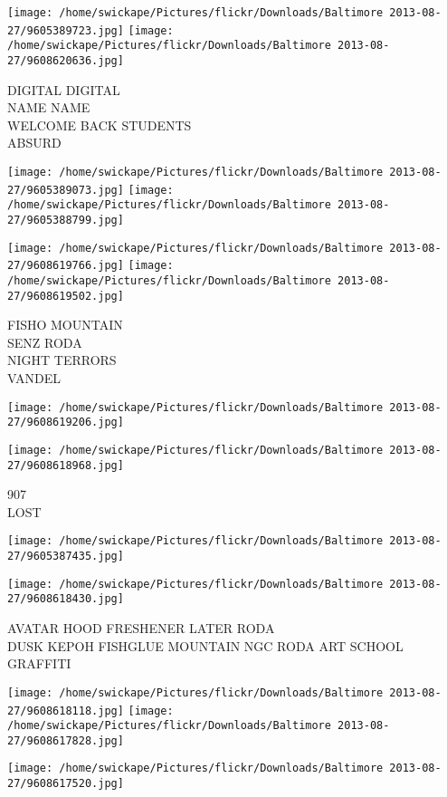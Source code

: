 \documentclass[10pt,letterpaper]{article}
\begin{document}
\texttt{[image: /home/swickape/Pictures/flickr/Downloads/Baltimore 2013-08-27/9605389723.jpg]}
\texttt{[image: /home/swickape/Pictures/flickr/Downloads/Baltimore 2013-08-27/9608620636.jpg]}

DIGITAL DIGITAL\\
NAME NAME\\
WELCOME BACK STUDENTS\\
ABSURD
\pagebreak

\texttt{[image: /home/swickape/Pictures/flickr/Downloads/Baltimore 2013-08-27/9605389073.jpg]}
\texttt{[image: /home/swickape/Pictures/flickr/Downloads/Baltimore 2013-08-27/9605388799.jpg]}

\texttt{[image: /home/swickape/Pictures/flickr/Downloads/Baltimore 2013-08-27/9608619766.jpg]}
\texttt{[image: /home/swickape/Pictures/flickr/Downloads/Baltimore 2013-08-27/9608619502.jpg]}

FISHO MOUNTAIN\\
SENZ RODA\\
NIGHT TERRORS\\
VANDEL
\pagebreak

\texttt{[image: /home/swickape/Pictures/flickr/Downloads/Baltimore 2013-08-27/9608619206.jpg]}

\vspace{0.25in}
\texttt{[image: /home/swickape/Pictures/flickr/Downloads/Baltimore 2013-08-27/9608618968.jpg]}

907\\
LOST
\pagebreak

\texttt{[image: /home/swickape/Pictures/flickr/Downloads/Baltimore 2013-08-27/9605387435.jpg]}

\vspace{0.25in}
\texttt{[image: /home/swickape/Pictures/flickr/Downloads/Baltimore 2013-08-27/9608618430.jpg]}

AVATAR HOOD FRESHENER LATER RODA\\
DUSK KEPOH FISHGLUE MOUNTAIN NGC RODA ART SCHOOL GRAFFITI
\pagebreak

\texttt{[image: /home/swickape/Pictures/flickr/Downloads/Baltimore 2013-08-27/9608618118.jpg]}
\texttt{[image: /home/swickape/Pictures/flickr/Downloads/Baltimore 2013-08-27/9608617828.jpg]}

\texttt{[image: /home/swickape/Pictures/flickr/Downloads/Baltimore 2013-08-27/9608617520.jpg]}
\end{document}
